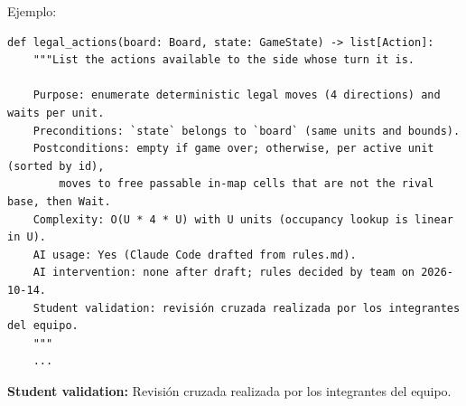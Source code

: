 Ejemplo:
\begin{verbatim}
def legal_actions(board: Board, state: GameState) -> list[Action]:
    """List the actions available to the side whose turn it is.

    Purpose: enumerate deterministic legal moves (4 directions) and waits per unit.
    Preconditions: `state` belongs to `board` (same units and bounds).
    Postconditions: empty if game over; otherwise, per active unit (sorted by id),
        moves to free passable in-map cells that are not the rival base, then Wait.
    Complexity: O(U * 4 * U) with U units (occupancy lookup is linear in U).
    AI usage: Yes (Claude Code drafted from rules.md).
    AI intervention: none after draft; rules decided by team on 2026-10-14.
    Student validation: revisión cruzada realizada por los integrantes del equipo.
    """
    ...
\end{verbatim}

\textbf{Student validation:} Revisión cruzada realizada por los integrantes del equipo.
